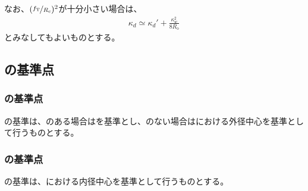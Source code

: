 なお、$(\nicefrac{f_\mathrm T}{R_\mathrm c})^2$が十分小さい場合は、
\begin{align*}
  \kappa_d \simeq \kappa_d'+\frac{\kappa_w^2}{8R_\mathrm o}
\end{align*}
とみなしてもよいものとする。



\clearpage


\subsection{\EndFaceCChamferMilling の基準点}

\subsubsection{\EndFaceOutCChamferMilling の基準点}
\EndFaceOutCChamferMilling の基準は、\Outcut のある場合は\OutcutCenter を基準とし、\Outcut のない場合は\nameEndFace における外径中心を基準として行うものとする。

\subsubsection{\EndFaceInCChamferMilling の基準点}
\EndFaceInCChamferMilling の基準は、\nameOutcut における内径中心を基準として行うものとする。


